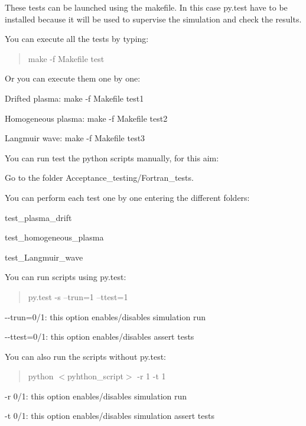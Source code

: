 These tests can be launched using the makefile. In this case py.\+test have to be installed because it will be used to supervise the simulation and check the results.

You can execute all the tests by typing\+:

\begin{quote}
make -\/f Makefile test \end{quote}


Or you can execute them one by one\+:


\begin{DoxyItemize}
\item Drifted plasma\+: {\ttfamily make -\/f Makefile test1}
\item Homogeneous plasma\+: {\ttfamily make -\/f Makefile test2}
\item Langmuir wave\+: {\ttfamily make -\/f Makefile test3}
\end{DoxyItemize}

You can run test the python scripts manually, for this aim\+:


\begin{DoxyItemize}
\item Go to the folder Acceptance\+\_\+testing/\+Fortran\+\_\+tests.
\item You can perform each test one by one entering the different folders\+:
\begin{DoxyItemize}
\item test\+\_\+plasma\+\_\+drift
\item test\+\_\+homogeneous\+\_\+plasma
\item test\+\_\+\+Langmuir\+\_\+wave
\end{DoxyItemize}
\item You can run scripts using py.\+test\+: \begin{quote}
py.\+test -\/s --trun=1 --ttest=1 \end{quote}

\begin{DoxyItemize}
\item {\ttfamily -\/-\/trun=0/1}\+: this option enables/disables simulation run
\item {\ttfamily -\/-\/ttest=0/1}\+: this option enables/disables assert tests
\end{DoxyItemize}
\item You can also run the scripts without py.\+test\+: \begin{quote}
python $<$pyhthon\+\_\+script$>$ -\/r 1 -\/t 1 \end{quote}

\begin{DoxyItemize}
\item {\ttfamily -\/r 0/1}\+: this option enables/disables simulation run
\item {\ttfamily -\/t 0/1}\+: this option enables/disables simulation assert tests
\end{DoxyItemize}
\end{DoxyItemize}

